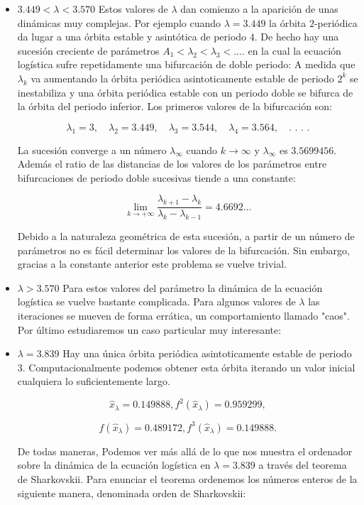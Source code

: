 \documentclass[12pt,a4paper]{report}
\theoremstyle{definition}
\begin{document}
\begin{itemize}

\item $3.449 < \lambda < 3.570$ Estos valores de $\lambda$ dan comienzo a la aparición de unas dinámicas muy complejas. Por ejemplo cuando $\lambda = 3.449$ la órbita $2$-periódica da lugar a una órbita estable y asintótica de periodo $4$. De hecho hay una sucesión creciente de parámetros $A_1 < \lambda_2 < \lambda_3 < ....$ en la cual la ecuación logística sufre repetidamente una bifurcación de doble periodo: A medida que $\lambda_k$ va aumentando la órbita periódica asintoticamente estable de periodo $2^k$ se inestabiliza y una órbita periódica estable con un periodo doble se bifurca de la órbita del periodo inferior. Los primeros valores de la bifurcación son:

$$
\lambda_1 = 3, \quad \lambda_2 = 3.449, \quad \lambda_3 = 3.544, \quad \lambda_4 = 3.564, \quad \text{.\ .\ .\ .}
$$

La sucesión converge a un número $\lambda_\infty$ cuando $k \to \infty$ y $\lambda_\infty$ es $3.5699456$. Además el ratio de las distancias de los valores de los parámetros entre  bifurcaciones de periodo doble sucesivas tiende a una constante:

$$
\lim_{k \to +\infty} \frac{\lambda_{k+1} - \lambda_k}{\lambda_k - \lambda_{k-1}} = 4.6692 \ldots
$$

Debido a la naturaleza geométrica de esta sucesión, a partir de un número de parámetros no es fácil determinar los valores de la bifurcación. Sin embargo, gracias a la constante anterior este problema se vuelve trivial.

\item $\lambda > 3.570$ Para estos valores del parámetro la dinámica de la ecuación logística se vuelve bastante complicada. Para algunos valores de $\lambda$ las iteraciones se mueven de forma errática, un comportamiento llamado "caos". Por último estudiaremos un caso particular muy interesante:

\item $\lambda = 3.839$ Hay una única órbita periódica asintoticamente estable de periodo $3$. Computacionalmente podemos obtener esta órbita iterando un valor inicial cualquiera lo suficientemente largo.

$$
\hat{x}_\lambda = 0.149888,f^2(\hat{x}_\lambda) = 0.959299,
$$

$$
f(\hat{x}_\lambda) = 0.489172, f^3(\hat{x}_\lambda) = 0.149888.
$$

De todas maneras, Podemos ver más allá de lo que nos muestra el ordenador sobre la dinámica de la ecuación logística en $\lambda = 3.839$ a través del teorema de Sharkovskii. Para enunciar el teorema ordenemos los números enteros de la siguiente manera, denominada orden de Sharkovskii:


\end{itemize}
\end{document}
